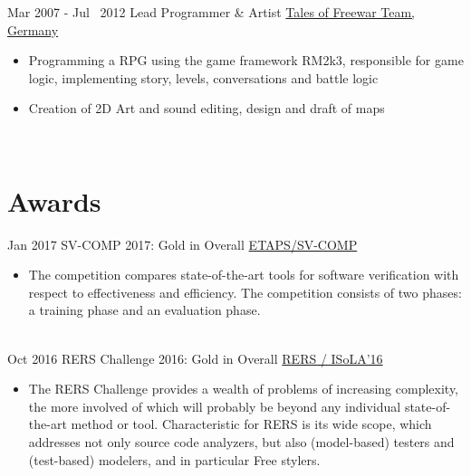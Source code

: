 \documentclass[letterpaper]{twentysecondcv} %
\begin{document}
\begin{twenty}
	\twentyitem
    		{Mar 2007 -}
		{Jul~ 2012}
        		{Lead Programmer \& Artist}
        		{\href{https://github.com/ZabuzaW/TalesOfFreewar}{Tales of Freewar Team, Germany}}
        		{}
        		{\begin{itemize}
        			\item Programming a RPG using the game framework RM2k3, responsible for game logic,
        				implementing story, levels, conversations and battle logic
        			\item Creation of 2D Art and sound editing, design and draft of maps
        		\end{itemize}}\\
\end{twenty}


\section{Awards}
\begin{twenty} %
	\twentyitem
    		{Jan 2017}
		{}
        		{SV-COMP 2017: Gold in Overall}
        		{\href{https://sv-comp.sosy-lab.org/2017/}{ETAPS/SV-COMP}}
        		{}
        		{\begin{itemize}
        			\item The competition compares state-of-the-art tools for software verification with respect to effectiveness
        				and efficiency. The competition consists of two phases: a training phase and an evaluation phase.
        		\end{itemize}}\\
        	\twentyitem
    		{Oct 2016}
		{}
        		{RERS Challenge 2016: Gold in Overall}
        		{\href{http://rers-challenge.org/2016/}{RERS / ISoLA'16}}
        		{}
        		{\begin{itemize}
        			\item The RERS Challenge provides a wealth of problems of increasing complexity, the more involved of
        				which will probably be beyond any individual state-of-the-art method or tool. Characteristic for RERS
        				is its wide scope, which addresses not only source code analyzers, but also (model-based) testers
        				and (test-based) modelers, and in particular Free stylers.
        		\end{itemize}}\\
\end{twenty}
\end{document}
